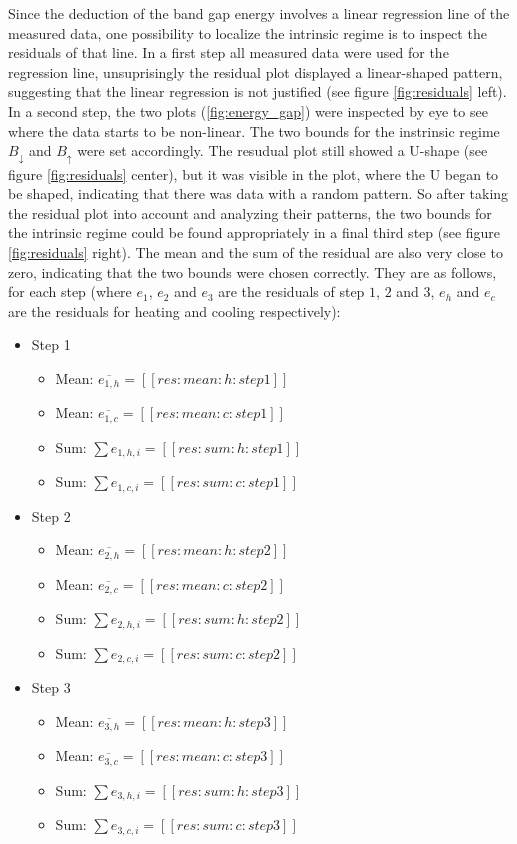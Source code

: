 \documentclass[a4paper]{article}
\begin{document}
Since the deduction of the band gap energy involves a linear regression line of the measured data, one possibility to localize the intrinsic regime is to inspect the residuals of that line. In a first step all measured data were used for the regression line, unsuprisingly the residual plot displayed a linear-shaped pattern, suggesting that the linear regression is not justified (see figure \ref{fig:residuals} left). In a second step, the two plots (\ref{fig:energy_gap}) were inspected by eye to see where the data starts to be non-linear. The two bounds for the instrinsic regime $B_{\downarrow}$ and $B_{\uparrow}$ were set accordingly. The resudual plot still showed a U-shape (see figure \ref{fig:residuals} center), but it was visible in the plot, where the U began to be shaped, indicating that there was data with a random pattern. So after taking the residual plot into account and analyzing their patterns, the two bounds for the intrinsic regime could be found appropriately in a final third step (see figure \ref{fig:residuals} right). The mean and the sum of the residual are also very close to zero, indicating that the two bounds were chosen correctly. They are as follows, for each step (where $e_1$, $e_2$ and $e_3$ are the residuals of step $1$, $2$ and $3$, $e_h$ and $e_c$ are the residuals for heating and cooling respectively):

\begin{itemize}
	\item Step 1
	\begin{itemize}
		\item Mean: $\overline{e_{1,h}} = [[res:mean:h:step1]]$
		\item Mean: $\overline{e_{1,c}} = [[res:mean:c:step1]]$
		\item Sum: $\sum {e_{1,h,i}} = [[res:sum:h:step1]]$
		\item Sum: $\sum {e_{1,c,i}} = [[res:sum:c:step1]]$
	\end{itemize}
	\item Step 2
	\begin{itemize}
		\item Mean: $\overline{e_{2,h}} = [[res:mean:h:step2]]$
		\item Mean: $\overline{e_{2,c}} = [[res:mean:c:step2]]$
		\item Sum: $\sum {e_{2,h,i}} = [[res:sum:h:step2]]$
		\item Sum: $\sum {e_{2,c,i}} = [[res:sum:c:step2]]$
	\end{itemize}
	\item Step 3
	\begin{itemize}
		\item Mean: $\overline{e_{3,h}} = [[res:mean:h:step3]]$
		\item Mean: $\overline{e_{3,c}} = [[res:mean:c:step3]]$
		\item Sum: $\sum {e_{3,h,i}} = [[res:sum:h:step3]]$
		\item Sum: $\sum {e_{3,c,i}} = [[res:sum:c:step3]]$
	\end{itemize}
\end{itemize}
\end{document}
